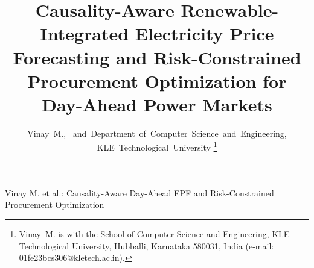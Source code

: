 \documentclass[journal,10pt,twocolumn]{IEEEtran}
\begin{document}
\title{Causality-Aware Renewable-Integrated Electricity Price Forecasting and Risk-Constrained Procurement Optimization for Day-Ahead Power Markets}

\author{Vinay~M.,~
and~Department~of~Computer~Science~and~Engineering, KLE~Technological~University%
\thanks{Vinay~M. is with the School of Computer Science and Engineering, KLE Technological University, Hubballi, Karnataka 580031, India (e-mail: 01fe23bcs306@kletech.ac.in).}}

%
{Vinay M. et al.: Causality-Aware Day-Ahead EPF and Risk-Constrained Procurement Optimization}

\maketitle
\end{document}
